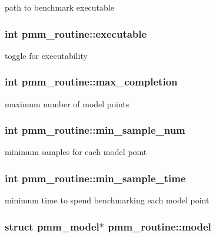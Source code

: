 path to benchmark executable \hypertarget{structpmm__routine_a7d23ff1fa04ae3364eef3cab8bdbd684}{
\subsubsection[{executable}]{\setlength{\rightskip}{0pt plus 5cm}int pmm\-\_\-routine\-::executable}}\label{structpmm__routine_a7d23ff1fa04ae3364eef3cab8bdbd684}
toggle for executability \hypertarget{structpmm__routine_ab8f49fc3bbd1e464e2740f17d962f2e6}{
\subsubsection[{max\-\_\-completion}]{\setlength{\rightskip}{0pt plus 5cm}int pmm\-\_\-routine\-::max\-\_\-completion}}\label{structpmm__routine_ab8f49fc3bbd1e464e2740f17d962f2e6}
maximum number of model points \hypertarget{structpmm__routine_a221cb65185ab20cfa469683a3b0cdb59}{
\subsubsection[{min\-\_\-sample\-\_\-num}]{\setlength{\rightskip}{0pt plus 5cm}int pmm\-\_\-routine\-::min\-\_\-sample\-\_\-num}}\label{structpmm__routine_a221cb65185ab20cfa469683a3b0cdb59}
minimum samples for each model point \hypertarget{structpmm__routine_a1100a0314d4d64440a0a2fb9467e69a0}{
\subsubsection[{min\-\_\-sample\-\_\-time}]{\setlength{\rightskip}{0pt plus 5cm}int pmm\-\_\-routine\-::min\-\_\-sample\-\_\-time}}\label{structpmm__routine_a1100a0314d4d64440a0a2fb9467e69a0}
minimum time to spend benchmarking each model point \hypertarget{structpmm__routine_a8bd08af93178ac419df0657486609594}{
\subsubsection[{model}]{\setlength{\rightskip}{0pt plus 5cm}struct {\bf pmm\-\_\-model}$\ast$ pmm\-\_\-routine\-::model}}\label{structpmm__routine_a8bd08af93178ac419df0657486609594}
